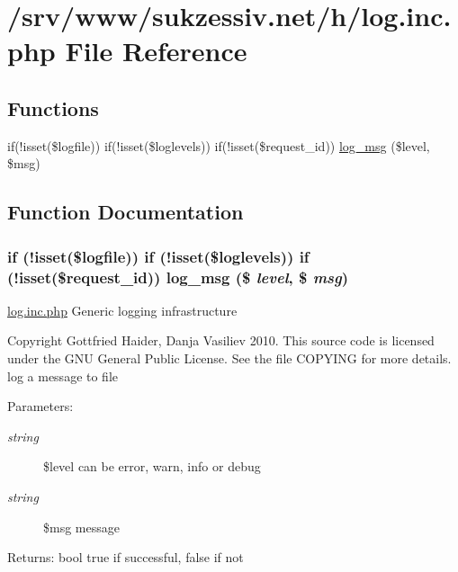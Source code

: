 \hypertarget{log_8inc_8php}{
\section{/srv/www/sukzessiv.net/h/log.inc.php File Reference}
\label{log_8inc_8php}
}
\subsection*{Functions}
\begin{CompactItemize}
\item 
if(!isset(\$logfile)) if(!isset(\$loglevels)) if(!isset(\$request\_\-id)) \hyperlink{log_8inc_8php_0d59d693ca96c65b67de4b197954ce60}{log\_\-msg} (\$level, \$msg)
\end{CompactItemize}


\subsection{Function Documentation}
\hypertarget{log_8inc_8php_0d59d693ca96c65b67de4b197954ce60}{
\subsubsection[{log\_\-msg}]{\setlength{\rightskip}{0pt plus 5cm}if (!isset(\$logfile)) if (!isset(\$loglevels)) if (!isset(\$request\_\-id)) log\_\-msg (\$ {\em level}, \/  \$ {\em msg})}}
\label{log_8inc_8php_0d59d693ca96c65b67de4b197954ce60}


\hyperlink{log_8inc_8php}{log.inc.php} Generic logging infrastructure

Copyright Gottfried Haider, Danja Vasiliev 2010. This source code is licensed under the GNU General Public License. See the file COPYING for more details. log a message to file

\begin{Desc}
\item[Parameters:]
\begin{description}
\item[{\em string}]\$level can be error, warn, info or debug \item[{\em string}]\$msg message \end{description}
\end{Desc}
\begin{Desc}
\item[Returns:]bool true if successful, false if not \end{Desc}
